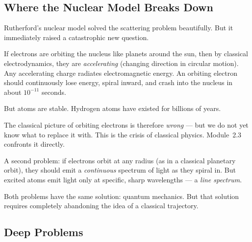 \documentclass[12pt, a4paper]{book}
\theoremstyle{definition}
\begin{document}
\subsection*{Where the Nuclear Model Breaks Down}

\begin{modelbreaks}
Rutherford's nuclear model solved the scattering problem
beautifully.
But it immediately raised a catastrophic new question.

If electrons are orbiting the nucleus like planets around
the sun, then by classical electrodynamics, they are
\emph{accelerating} (changing direction in circular motion).
Any accelerating charge radiates electromagnetic energy.
An orbiting electron should continuously lose energy,
spiral inward, and crash into the nucleus
in about $10^{-11}$ seconds.

But atoms are stable.
Hydrogen atoms have existed for billions of years.

The classical picture of orbiting electrons is therefore
\emph{wrong} --- but we do not yet know what to replace it with.
This is the crisis of classical physics.
Module~2.3 confronts it directly.

A second problem: if electrons orbit at any radius
(as in a classical planetary orbit), they should emit
a \emph{continuous} spectrum of light as they spiral in.
But excited atoms emit light only at specific, sharp
wavelengths --- a \emph{line spectrum}.

Both problems have the same solution: quantum mechanics.
But that solution requires completely abandoning the
idea of a classical trajectory.
\end{modelbreaks}

\subsection*{Deep Problems}
\end{document}
